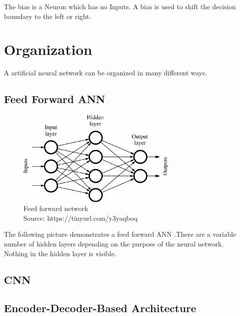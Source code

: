 The bias is a Neuron which has no Inputs. A bias is used to shift the decision boundary to the left or right.

\section{Organization}

A artificial neural network can be organized in many different ways.

\subsection{Feed Forward ANN}

\begin{figure}[h]
	\centering
	\includegraphics[width=0.7\textwidth]{./media/images/feed_forward_neural_network.png}
  	\caption{Feed forward network
  	\\Source: https://tinyurl.com/y3yaqboq}
  	\label{ffNN}
\end{figure}

The following picture demonstrates a feed forward ANN .There are a variable number of hidden layers depending on the purpose of the neural network. Nothing in the hidden layer is visible. 

\subsection{CNN}


\subsection{Encoder-Decoder-Based Architecture}









